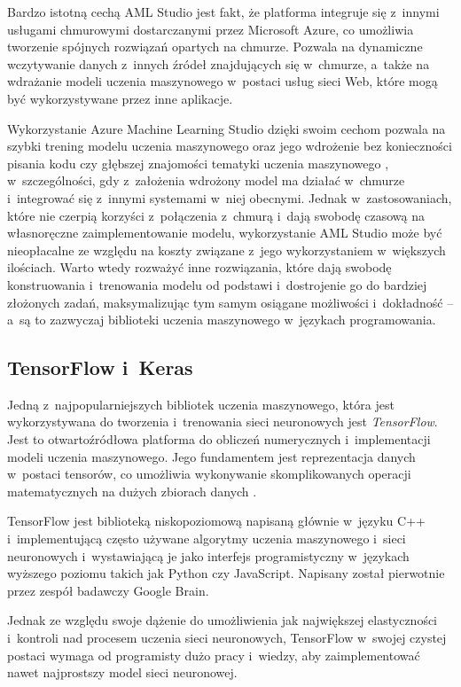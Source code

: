 Bardzo istotną cechą AML Studio jest fakt, że platforma integruje się z~innymi usługami chmurowymi dostarczanymi przez Microsoft Azure, co umożliwia tworzenie spójnych rozwiązań opartych na chmurze.
Pozwala na dynamiczne wczytywanie danych z~innych źródeł znajdujących się w~chmurze, a~także na wdrażanie modeli uczenia maszynowego w~postaci usług sieci Web, które mogą być wykorzystywane przez inne aplikacje.

Wykorzystanie Azure Machine Learning Studio dzięki swoim cechom pozwala na szybki trening modelu uczenia maszynowego oraz jego wdrożenie bez konieczności pisania kodu czy głębszej znajomości tematyki uczenia maszynowego \cite{mukunthu2019practical}, w~szczególności, gdy z~założenia wdrożony model ma działać w~chmurze i~integrować się z~innymi systemami w~niej obecnymi.
Jednak w~zastosowaniach, które nie czerpią korzyści z~połączenia z~chmurą i~dają swobodę czasową na własnoręczne zaimplementowanie modelu, wykorzystanie AML Studio może być nieopłacalne ze względu na koszty związane z~jego wykorzystaniem w~większych ilościach.
Warto wtedy rozważyć inne rozwiązania, które dają swobodę konstruowania i~trenowania modelu od podstawi i~dostrojenie go do bardziej złożonych zadań, maksymalizując tym samym osiągane możliwości i~dokładność -- a~są to zazwyczaj biblioteki uczenia maszynowego w~językach programowania.

\subsection{TensorFlow i~Keras}
\label{sec:tensorflow-and-keras}

Jedną z~najpopularniejszych bibliotek uczenia maszynowego, która jest wykorzystywana do tworzenia i~trenowania sieci neuronowych jest \emph{TensorFlow}.
Jest to otwartoźródłowa platforma do obliczeń numerycznych i~implementacji modeli uczenia maszynowego.
Jego fundamentem jest reprezentacja danych w~postaci tensorów, co umożliwia wykonywanie skomplikowanych operacji matematycznych na dużych zbiorach danych \cite{shukla2018machine}.

TensorFlow jest biblioteką niskopoziomową napisaną głównie w~języku C++ i~implementującą często używane algorytmy uczenia maszynowego i~sieci neuronowych i~wystawiającą je jako interfejs programistyczny w~językach wyższego poziomu takich jak Python czy JavaScript.
Napisany został pierwotnie przez zespół badawczy Google Brain.

Jednak ze względu swoje dążenie do umożliwienia jak największej elastyczności i~kontroli nad procesem uczenia sieci neuronowych, TensorFlow w~swojej czystej postaci wymaga od programisty dużo pracy i~wiedzy, aby zaimplementować nawet najprostszy model sieci neuronowej.

